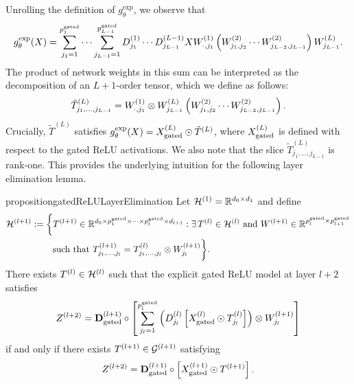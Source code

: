 Unrolling the definition of \( g_\theta^{\text{exp}} \),
we observe that
\[
    g_\theta^{\text{exp}}(X) =
    \sum_{j_1 = 1}^{p^{\text{gated}}_1} \cdots \sum_{j_{L-1} = 1}^{p^{\text{gated}}_{L-1}}
    D^{(1)}_{j_1} \cdots D^{(L-1)}_{j_{L-1}} X
    W^{(1)}_{\cdot, j_1} \left(W^{(2)}_{j_1, j_2} \cdots W^{(2)}_{j_{L-2}, j_{L-1}}\right) W^{(L)}_{j_{L-1}}.
\]
The product of network weights in this sum can be interpreted as the
decomposition of an \( L+1 \)-order tensor, which we define as follows:
\begin{equation}\label{eq:gated-relu-tensor}
    \tilde{T}^{(L)}_{j_1, \ldots, j_{L-1}}
    = W^{(1)}_{\cdot, j_1} \otimes W^{(L)}_{j_{L-1}} \left(W^{(2)}_{j_1, j_2}
    \cdots W^{(2)}_{j_{L-2}, j_{L-1}}\right) .
\end{equation}
Crucially, \( \tilde{T}^{(L)} \) satisfies
\( g_\theta^{\text{exp}}(X) = X^{(L)}_{\text{gated}} \odot \tilde{T}^{(L)} \),
where \( X^{(L)}_{\text{gated}} \) is defined with respect to the gated ReLU
activations.
We also note that the slice \( \tilde{T}^{(L)}_{j_1, \ldots, j_{L-1}} \) is
rank-one.
This provides the underlying intuition for the following layer elimination
lemma.

\begin{restatable}{proposition}{gatedReLULayerElimination}%
    \label{prop:gated-layer-elimination}
    Let \( \mathcal{H}^{(1)} = \mathbb{R}^{d_0 \times d_1} \) and define
    \begin{equation}\label{eq:gated-tensor-decomp}
        \begin{aligned}
            \mathcal{H}^{(l+1)}
             & := \bigg\{ T^{(l+1)}
            \in \mathbb{R}^{d_{0} \times p_{1}^{\text{gated}} \times \cdots \times p_{l}^{\text{gated}} \times d_{l+1}}
            :  \exists \, T^{(l)} \in \mathcal{H}^{(l)}
            \text{ and } W^{(l+1)} \in \mathbb{R}^{p_l^{\text{gated}} \times p^{\text{gated}}_{l+1}} \\
             & \hspace{2em} \text{ such that } T^{(l+1)}_{j_1, \ldots, j_{l}}
            = T^{(l)}_{j_1, \ldots, j_{l}}
            \otimes W^{(l+1)}_{j_l}
            \bigg\}.
        \end{aligned}
    \end{equation}
    There exists \( T^{(l)} \in \mathcal{H}^{(l)} \) such that
    the explicit gated ReLU model at layer \( l+2 \) satisfies
    \begin{equation}\label{eq:gated-layer-to-tensorize}
        Z^{(l+2)} = \mathbf{D}^{(l+1)}_\text{gated} \circ
        \left[\sum_{j_l=1}^{p_l^{\text{gated}}} \left(D^{(l)}_{j_l} \left[X^{(l)}_{\text{gated}} \odot T^{(l)}_{j_l}\right]\right)
        \otimes W^{(l+1)}_{j_l}\right]
    \end{equation}
    if and only if there exists \( T^{(l+1)} \in \mathcal{G}^{(l+1)} \) satisfying
    \[
        Z^{(l+2)} =
        \mathbf{D}^{(l+1)}_\text{gated} \circ \left[X^{(l+1)}_{\text{gated}} \odot T^{(l+1)}\right].
    \]
\end{restatable}

